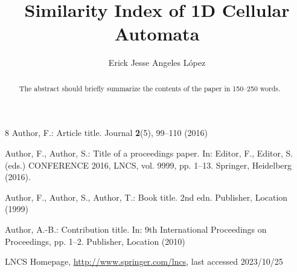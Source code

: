\documentclass[runningheads]{llncs}
\begin{document}
%
\title{Similarity Index of 1D Cellular Automata}

\author{Erick Jesse Angeles L\'opez}
%
%
%
\maketitle              %
%
\begin{abstract}
The abstract should briefly summarize the contents of the paper in
150--250 words.

\end{abstract}
%
%
%




%
%
%
% 
% 
%
\begin{thebibliography}{8}
Author, F.: Article title. Journal \textbf{2}(5), 99--110 (2016)

Author, F., Author, S.: Title of a proceedings paper. In: Editor,
F., Editor, S. (eds.) CONFERENCE 2016, LNCS, vol. 9999, pp. 1--13.
Springer, Heidelberg (2016). 

Author, F., Author, S., Author, T.: Book title. 2nd edn. Publisher,
Location (1999)

Author, A.-B.: Contribution title. In: 9th International Proceedings
on Proceedings, pp. 1--2. Publisher, Location (2010)

LNCS Homepage, \url{http://www.springer.com/lncs}, last accessed 2023/10/25
\end{thebibliography}
\end{document}
